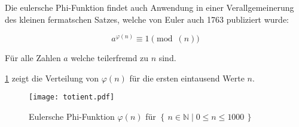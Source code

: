 Die eulersche Phi-Funktion findet auch Anwendung in einer Verallgemeinerung des kleinen fermatschen Satzes, welche von Euler auch 1763 publiziert wurde:

\begin{equation}
  a^{\varphi(n)} \equiv 1\pmod(n)
\end{equation}

Für alle Zahlen $a$ welche teilerfremd zu $n$ sind.\cite{mw03}

\ref{totative_dist} zeigt die Verteilung von $\varphi(n)$ für die ersten eintausend Werte $n$.

\begin{figure}[H]
  \texttt{[image: totient.pdf]}
  \caption{Eulersche Phi-Funktion $\varphi(n)$ für $\left\{\,n \in \mathbb{N}\mid 0 \le n \le 1000 \, \right\}$}
  \label{totative_dist}
\end{figure}
